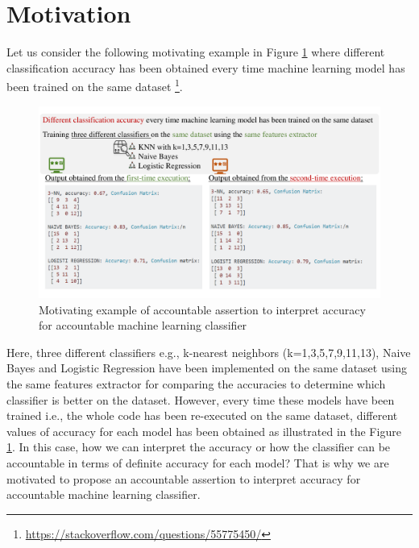 \section{Motivation}
\label{sec:motivation}

Let us consider the following motivating example in Figure \ref{fig:motiv} where different classification accuracy has been obtained every time machine learning model has been trained on the same dataset  \footnote{\small \url{https://stackoverflow.com/questions/55775450/}}. 
\begin{figure}[h]
	\includegraphics[width=\linewidth]{motivfigure.pdf}
	\caption{Motivating example of accountable assertion to interpret accuracy for accountable machine learning classifier}
	\label{fig:motiv}
\end{figure}
Here, three different classifiers e.g., k-nearest neighbors (k=1,3,5,7,9,11,13), Naive Bayes and Logistic Regression have been implemented on the same dataset using the same features extractor for comparing the accuracies to determine which classifier is better on the dataset. However, every time these models have been trained i.e., the whole code has been re-executed on the same dataset, different values of accuracy for each model has been obtained as illustrated in the Figure \ref{fig:motiv}. In this case, how we can interpret the accuracy or how the classifier can be accountable in terms of definite accuracy for each model? That is why we are motivated to propose an accountable assertion to interpret accuracy for accountable machine learning classifier.  



%
%
%
%
%
